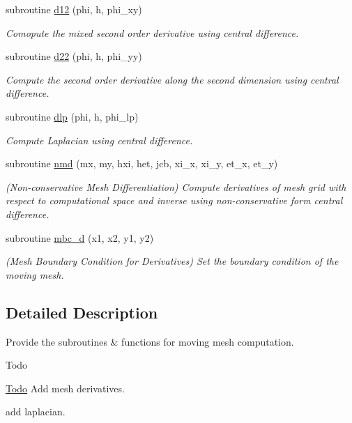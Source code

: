 \begin{DoxyCompactItemize}
subroutine \hyperlink{namespacemirana_ad3ac07295401fa4e0da8c4fa3bcc2cd4}{d12} (phi, h, phi\+\_\+xy)
\begin{DoxyCompactList}\small\item\em Comopute the mixed second order derivative using central difference. \end{DoxyCompactList}\item 
subroutine \hyperlink{namespacemirana_a9161b0947ddd188ac99d9246a1d81aed}{d22} (phi, h, phi\+\_\+yy)
\begin{DoxyCompactList}\small\item\em Compute the second order derivative along the second dimension using central difference. \end{DoxyCompactList}\item 
subroutine \hyperlink{namespacemirana_ab052150258d81ff9a91ca5b86f0359b3}{dlp} (phi, h, phi\+\_\+lp)
\begin{DoxyCompactList}\small\item\em Compute Laplacian using central difference. \end{DoxyCompactList}\item 
subroutine \hyperlink{namespacemirana_a53c223d4530275ef3fc6a5820f5b0990}{nmd} (mx, my, hxi, het, jcb, xi\+\_\+x, xi\+\_\+y, et\+\_\+x, et\+\_\+y)
\begin{DoxyCompactList}\small\item\em (Non-\/conservative Mesh Differentiation) Compute derivatives of mesh grid with respect to computational space and inverse using non-\/conservative form central difference. \end{DoxyCompactList}\item 
subroutine \hyperlink{namespacemirana_a65a514d206d0e8ae53253938d2aff553}{mbc\+\_\+d} (x1, x2, y1, y2)
\begin{DoxyCompactList}\small\item\em (Mesh Boundary Condition for Derivatives) Set the boundary condition of the moving mesh. \end{DoxyCompactList}\end{DoxyCompactItemize}


\subsection{Detailed Description}
Provide the subroutines \& functions for moving mesh computation. 

\begin{DoxyRefDesc}{Todo}
\item[\hyperlink{todo__todo000001}{Todo}]Add mesh derivatives. 

add laplacian. \end{DoxyRefDesc}


